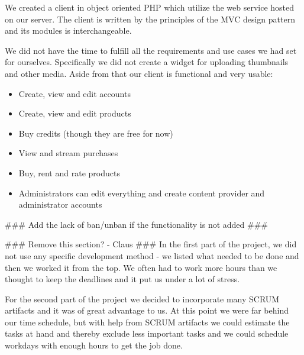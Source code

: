 We created a client in object oriented PHP which utilize the web service hosted on our server. The client is written by the principles of the MVC design pattern and its modules is interchangeable.

We did not have the time to fulfill all the requirements and use cases we had set for ourselves. Specifically we did not create a widget for uploading thumbnails and other media. Aside from that our client is functional and very usable:
\begin{itemize}
\item Create, view and edit accounts
\item Create, view and edit products
\item Buy credits (though they are free for now)
\item View and stream purchases
\item Buy, rent and rate products
\item Administrators can edit everything and create content provider and administrator accounts
\end{itemize}

\#\#\# Add the lack of ban/unban if the functionality is not added \#\#\#

\#\#\# Remove this section? - Claus \#\#\#
In the first part of the project, we did not use any specific development method - we listed what needed to be done and then we worked it from the top. We often had to work more hours than we thought to keep the deadlines and it put us under a lot of stress.

For the second part of the project we decided to incorporate many SCRUM artifacts and it was of great advantage to us. At this point we were far behind our time schedule, but with help from SCRUM artifacts we could estimate the tasks at hand and thereby exclude less important tasks and we could schedule workdays with enough hours to get the job done.
\newpage